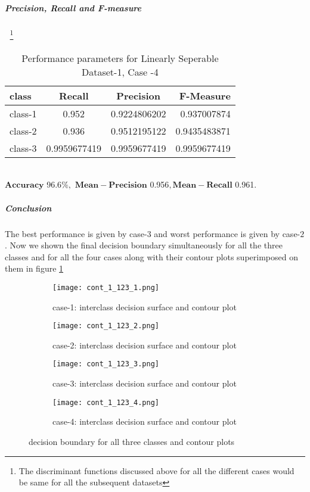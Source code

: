 \documentclass[a4paper]{article}
\begin{document}
\subparagraph{Precision, Recall and F-measure}\textcolor{white}{:}
\footnote{The discriminant functions discussed above for all the different cases would be same for all the subsequent datasets}
\begin{table}[h!]
  \begin{center}
    \caption{Performance parameters for Linearly Seperable Dataset-1, Case -4}
    \label{tab:table1}
    \begin{tabular}{l|c|c|r} %
      \textbf{class} & \textbf{Recall} & \textbf{Precision} & \textbf{F-Measure}\\
      \hline
      class-1 & 0.952 & 0.9224806202 & 0.937007874\\
      class-2 & 0.936 & 0.9512195122 & 0.9435483871\\
      class-3 & 0.9959677419 & 0.9959677419 & 0.9959677419\\
    \end{tabular}
  \end{center}
\end{table}
\\$\mathbf{Accuracy}$ 96.6$\%,$ $\mathbf{Mean- Precision}$ 0.956$, \mathbf{Mean -Recall}$ 0.961$.$
\newpage
\subparagraph{Conclusion}
The best performance is given by case-$3$ and worst performance is given by case-$2$. Now we shown the final decision boundary simultaneously for all the three classes and for all the four cases along with their contour plots superimposed on them in figure \ref{fig:cont_1_4}
\begin{figure}[h!]
  \centering
  \begin{subfigure}[b]{0.4\linewidth}
    \texttt{[image: cont\_1\_123\_1.png]}
     \caption{case-1: interclass decision surface and contour plot}
  \end{subfigure}
  \begin{subfigure}[b]{0.4\linewidth}
    \texttt{[image: cont\_1\_123\_2.png]}
    \caption{case-2: interclass decision surface and contour plot}
  \end{subfigure}
  \begin{subfigure}[b]{0.4\linewidth}
    \texttt{[image: cont\_1\_123\_3.png]}
    \caption{case-3: interclass decision surface and contour plot}
  \end{subfigure}
  \begin{subfigure}[b]{0.4\linewidth}
    \texttt{[image: cont\_1\_123\_4.png]}
    \caption{case-4: interclass decision surface and contour plot}
  \end{subfigure}
  \caption{decision boundary for all three classes and contour plots}
  \label{fig:cont_1_4}
\end{figure}
\goodbreak \newpage \newpage
\end{document}
